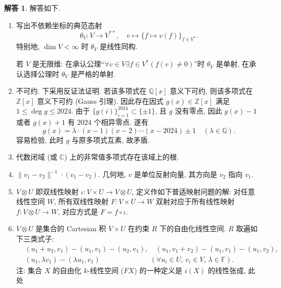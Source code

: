 \documentclass{MainStyle}
\theoremstyle{definition}
\newtheorem{solution}{解答}
\begin{document}
\begin{solution}
    解答如下.
    \begin{enumerate}
        \item 写出不依赖坐标的典范态射
              \begin{equation*}
                  \theta_V: V\to V^{\ast\ast},\quad v\mapsto \{f\mapsto v(f)\}_{f\in V^{\ast}}.
              \end{equation*}
              特别地, $\dim V<\infty$ 时 $\theta_V$ 是线性同构.

              若 $V$ 是无限维: 在承认公理``$\forall v\in V\exists f\in V^\ast (f(v)\neq 0)$''时 $\theta_V$ 是单射, 在承认选择公理时 $\theta_V$ 是严格的单射.
        \item 不可约. 下采用反证法证明. 若该多项式在 $\mathbb Q[x]$ 意义下可约, 则该多项式在 $\mathbb Z[x]$ 意义下可约 (Gauss 引理). 因此存在因式 $g(x)\in \mathbb Z[x]$ 满足 $1\leq \deg g\leq 2024$. 由于 $\{g(i)\}_{i=1}^{2024}\subset \{\pm 1\}$, 且 $g$ 没有零点, 因此 $g(x)-1$ 或者 $g(x)+1$ 有 $2024$ 个相异零点. 遂有
              \begin{equation*}
                  g(x)=\lambda\cdot (x-1)(x-2)\cdots (x-2024)\pm 1 \quad (\lambda\in \mathbb Q).
              \end{equation*}
              容易检验, 此时 $g$ 与原多项式互素, 故矛盾.
        \item 代数闭域 (或 $\mathbb C$) 上的非常值多项式存在该域上的根.
        \item $\|v_1-v_2\|^{-1}\cdot (v_1-v_2)$. 几何地, $v$ 是单位反射向量, 其方向是 $v_2$ 指向 $v_1$.
        \item $V\otimes U$ 即双线性映射 $\iota: V\times U\to V\otimes U$, 定义作如下普适映射问题的解: 对任意线性空间 $W$, 所有双线性映射 $F:V\times U\to W$ 双射对应于所有线性映射 $f:V\otimes U\to W$, 对应方式是 $F=f\circ \iota$.
        \item $V\otimes U$ 是集合的 Cartesian 积 $V\times U$ 在约束 $R$ 下的自由化线性空间. $R$ 取遍如下三类式子:
              \begin{align*}
                   & (u_1+u_2,v_1)-(u_1,v_1)-(u_2,v_1),\quad (u_1,v_1+v_2)-(u_1,v_1)-(u_1,v_2),                                       \\[6pt]
                   & (u_1,\lambda v_1)-(\lambda u_1,v_1)\qquad\qquad\qquad\quad (\forall u_i\in U,\,v_i\in V,\,\lambda\in \mathbb F).
              \end{align*}
              注: 集合 $X$ 的自由化 $k$-线性空间 ($FX$) 的一种定义是 $i(X)$ 的线性张成, 此处
              \begin{equation}

\end{equation}
\end{enumerate}
\end{solution}
\end{document}
